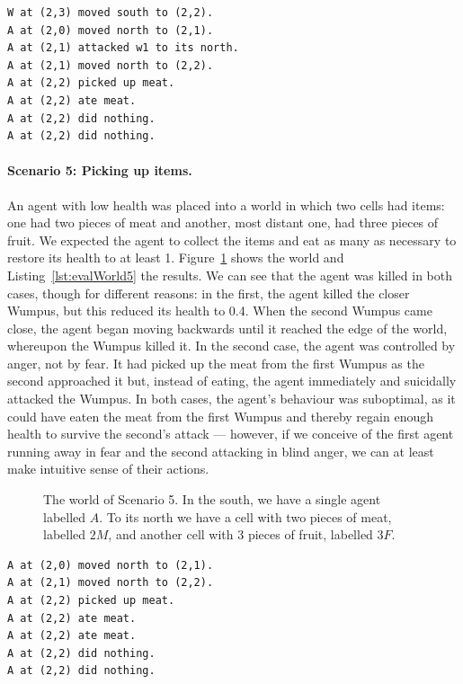 \begin{lstlisting}[caption=Actions in Scenario 4., label=lst:evalWorld4, float=t]
W at (2,3) moved south to (2,2).
A at (2,0) moved north to (2,1).
A at (2,1) attacked w1 to its north.
A at (2,1) moved north to (2,2).
A at (2,2) picked up meat.
A at (2,2) ate meat.
A at (2,2) did nothing.
A at (2,2) did nothing.
\end{lstlisting}

\paragraph{Scenario 5: Picking up items.} An agent with low health was placed into a world in which two cells had items: one had two pieces of meat and another, most distant one, had three pieces of fruit. We expected the agent to collect the items and eat as many as necessary to restore its health to at least 1. Figure~\ref{fig:evalWorld5} shows the world and Listing~\ref{lst:evalWorld5} the results. We can see that the agent was killed in both cases, though for different reasons: in the first, the agent killed the closer Wumpus, but this reduced its health to 0.4. When the second Wumpus came close, the agent began moving backwards until it reached the edge of the world, whereupon the Wumpus killed it. In the second case, the agent was controlled by anger, not by fear. It had picked up the meat from the first Wumpus as the second approached it but, instead of eating, the agent immediately and suicidally attacked the Wumpus. In both cases, the agent's behaviour was suboptimal, as it could have eaten the meat from the first Wumpus and thereby regain enough health to survive the second's attack --- however, if we conceive of the first agent running away in fear and the second attacking in blind anger, we can at least make intuitive sense of their actions.

\begin{figure}[t]
	\centering
	
	\caption{The world of Scenario 5. In the south, we have a single agent labelled $A$. To its north we have a cell with two pieces of meat, labelled $2M$, and another cell with 3 pieces of fruit, labelled $3F$.}
	\label{fig:evalWorld5}
\end{figure}

\begin{lstlisting}[caption=Actions in Scenario 5., label=lst:evalWorld5, float=t]
A at (2,0) moved north to (2,1).
A at (2,1) moved north to (2,2).
A at (2,2) picked up meat.
A at (2,2) ate meat.
A at (2,2) ate meat.
A at (2,2) did nothing.
A at (2,2) did nothing.
\end{lstlisting}

